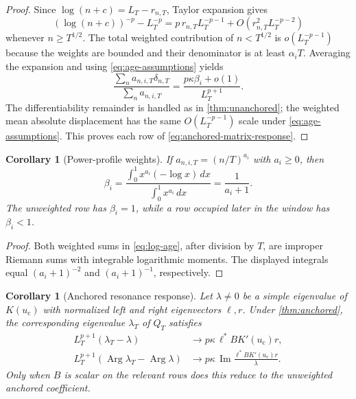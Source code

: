 \documentclass[11pt]{article}
\newtheorem{corollary}[theorem]{Corollary}
\theoremstyle{definition}
\theoremstyle{remark}
\newcommand{\uc}{u_{\mathrm c}}
\newcommand{\Arg}{\operatorname{Arg}}
\begin{document}
\begin{proof}
Since $\log(n+c)=L_T-r_{n,T}$, Taylor expansion gives
\[
  (\log(n+c))^{-p}-L_T^{-p}
  =p\,r_{n,T}L_T^{-p-1}
   +O(r_{n,T}^2L_T^{-p-2})
\]
whenever $n\ge T^{1/2}$.  The total weighted contribution of
$n<T^{1/2}$ is $o(L_T^{-p-1})$ because the weights are bounded and
their denominator is at least $\alpha_iT$.  Averaging the expansion and
using \eqref{eq:age-assumptions} yields
\[
  \frac{\sum_na_{n,i,T}\delta_{n,T}}{\sum_na_{n,i,T}}
  =
  \frac{p\kappa\beta_i+o(1)}{L_T^{p+1}}.
\]
The differentiability remainder is handled as in
\cref{thm:unanchored}; the weighted mean absolute displacement has the
same $O(L_T^{-p-1})$ scale under \eqref{eq:age-assumptions}.
This proves each row of \eqref{eq:anchored-matrix-response}.
\end{proof}

\begin{corollary}[Power-profile weights]\label{cor:power}
If $a_{n,i,T}=(n/T)^{a_i}$ with $a_i\ge0$, then
\begin{equation}\label{eq:power-age}
  \beta_i=
  \frac{\int_0^1x^{a_i}(-\log x)\,dx}
       {\int_0^1x^{a_i}\,dx}
  =\frac1{a_i+1}.
\end{equation}
The unweighted row has $\beta_i=1$, while a row occupied later in the
window has $\beta_i<1$.
\end{corollary}

\begin{proof}
Both weighted sums in \eqref{eq:log-age}, after division by $T$, are
improper Riemann sums with integrable logarithmic moments.  The displayed
integrals equal $(a_i+1)^{-2}$ and $(a_i+1)^{-1}$, respectively.
\end{proof}

\begin{corollary}[Anchored resonance response]\label{cor:anchored-eigen}
Let $\lambda\ne0$ be a simple eigenvalue of $K(\uc)$ with normalized left
and right eigenvectors $\ell,r$.  Under \cref{thm:anchored}, the
corresponding eigenvalue $\lambda_T$ of $Q_T$ satisfies
\begin{align}
  L_T^{p+1}(\lambda_T-\lambda)
  &\longrightarrow p\kappa\,\ell^*BK'(\uc)r,\label{eq:anchored-eigen}\\
  L_T^{p+1}(\Arg\lambda_T-\Arg\lambda)
  &\longrightarrow
  p\kappa\,\operatorname{Im}
  \frac{\ell^*BK'(\uc)r}{\lambda}.
  \label{eq:anchored-phase}
\end{align}
Only when $B$ is scalar on the relevant rows does this reduce to the
unweighted anchored coefficient.
\end{corollary}
\end{document}
